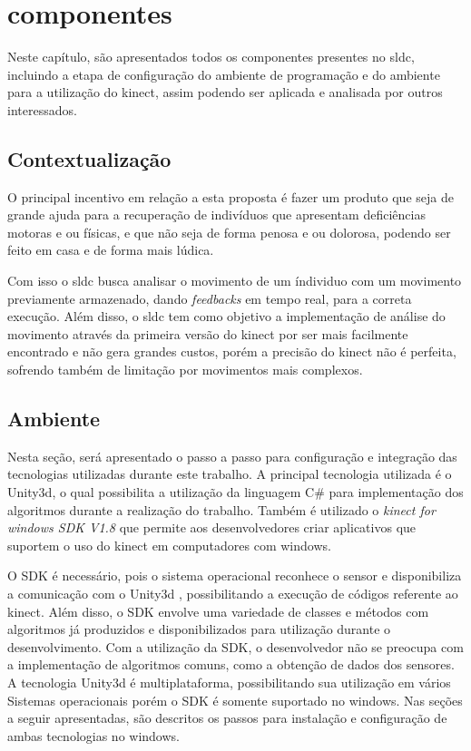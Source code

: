 \chapter[Componentes]{componentes}
  Neste capítulo, são apresentados todos os componentes presentes no sldc,
incluindo a etapa de configuração do ambiente de programação e
do ambiente para a utilização do kinect, assim podendo ser aplicada e analisada por outros interessados.

\section{Contextualização}
  O principal incentivo em relação a esta proposta é fazer um produto que seja de grande ajuda
para a recuperação de indivíduos que apresentam deficiências motoras e ou físicas, e que não
seja de forma penosa e ou dolorosa, podendo ser feito em casa e de forma mais lúdica.

  Com isso o sldc busca analisar o movimento de um índividuo com um movimento previamente
armazenado, dando \textit{feedbacks} em tempo real, para a correta execução. Além disso,
o sldc tem como objetivo a implementação de análise do movimento através da primeira
versão do kinect por ser mais facilmente encontrado e não gera grandes custos, porém
a precisão do kinect não é perfeita, sofrendo também de limitação por movimentos mais complexos.

\section{Ambiente}
  Nesta seção, será apresentado o passo a passo para configuração e integração das
tecnologias utilizadas durante este trabalho. A principal tecnologia utilizada é o Unity3d,
o qual possibilita a utilização da linguagem C\# para implementação dos algoritmos durante a realização do trabalho.
Também é utilizado o \textit{kinect for windows SDK V1.8 } que permite aos desenvolvedores
criar aplicativos que suportem o uso do kinect em computadores com windows.

 O SDK é necessário, pois o sistema operacional reconhece o sensor e disponibiliza a comunicação com o Unity3d
 , possibilitando a execução de códigos referente ao kinect. Além disso, o SDK envolve uma variedade
de classes e métodos com algoritmos já produzidos e disponibilizados para utilização
durante o desenvolvimento. Com a utilização da SDK, o desenvolvedor não se preocupa
com a implementação de algoritmos comuns, como a obtenção de dados dos
sensores.
A tecnologia Unity3d é multiplataforma, possibilitando sua utilização em vários Sistemas operacionais
porém o SDK é somente suportado no windows. Nas seções a seguir apresentadas, são descritos os passos para
instalação e configuração de ambas tecnologias no windows.

